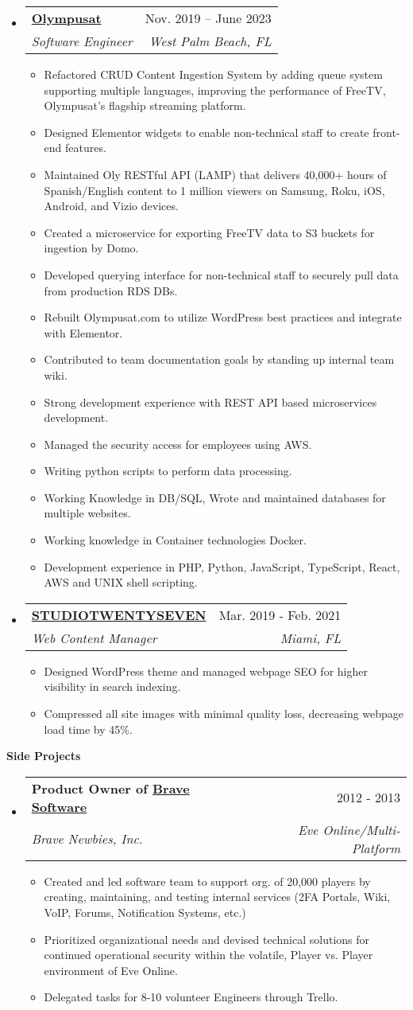 \documentclass[letterpaper,10pt]{article}[leftmargin=*]
\makeatletter
\def \entryspacing {-0pt}
\renewcommand{\section}[2]{\vspace{5pt}
  \colorbox{secondary}{\color{white}\raggedbottom\normalsize\textbf{{#1}{\hspace{7pt}#2}}}
}
\newcommand{\resumeEntryStart}{\begin{itemize}[leftmargin=2.5mm]}
\newcommand{\resumeEntryEnd}{\end{itemize}\vspace{\entryspacing}}
\newcommand{\resumeItemListStart}{\begin{itemize}[leftmargin=4.5mm]}
\newcommand{\resumeItemListEnd}{\end{itemize}}
\newcommand{\resumeItem}[1]{
  \item\small{
    {#1 \vspace{-2pt}}
  }
}
\newcommand{\resumeEntryTSDL}[4]{
  \vspace{-1pt}\item[]
    \begin{tabularx}{0.97\textwidth}{X@{\hspace{60pt}}r}
      \textbf{\color{primary}#1} & {\firabook\color{accent}\small#2} \\
      \textit{\color{accent}\small#3} & \textit{\color{accent}\small#4} \\
    \end{tabularx}\vspace{-6pt}
}
\makeatother
\begin{document}
  \resumeEntryStart
    \resumeEntryTSDL
      {\href{https://www.linkedin.com/company/olympusat/}{Olympusat}}{Nov. 2019 -- June 2023}
      {Software Engineer}{West Palm Beach, FL}
    \resumeItemListStart
      \resumeItem{Refactored CRUD Content Ingestion System by adding queue system supporting multiple languages, improving the performance of FreeTV, Olympusat’s flagship streaming platform.}
      \resumeItem{Designed Elementor widgets to enable non-technical staff to create front-end features.}
      \resumeItem{Maintained Oly RESTful API (LAMP) that delivers 40,000+ hours of Spanish/English content to 1 million viewers on Samsung, Roku, iOS, Android, and Vizio devices.}
      \resumeItem{Created a microservice for exporting FreeTV data to S3 buckets for ingestion by Domo.}
      \resumeItem{Developed querying interface for non-technical staff to securely pull data from production RDS DBs.}
      \resumeItem{Rebuilt Olympusat.com to utilize WordPress best practices and integrate with Elementor.}
      \resumeItem{Contributed to team documentation goals by standing up internal team wiki.}
      \resumeItem{Strong development experience with REST API based microservices development.}
      \resumeItem{Managed the security access for employees using AWS.}
      \resumeItem{Writing python scripts to perform data processing.}
      \resumeItem{Working Knowledge in DB/SQL, Wrote and maintained databases for multiple websites.}
      \resumeItem{Working knowledge in Container technologies Docker.}
      \resumeItem{Development experience in PHP, Python, JavaScript, TypeScript, React, AWS and UNIX shell scripting.}
    \resumeItemListEnd
  \resumeEntryEnd

  \resumeEntryStart
    \resumeEntryTSDL
      {\href{https://studiotwentyseven.com/}{STUDIOTWENTYSEVEN}}{Mar. 2019 - Feb. 2021}
      {Web Content Manager}{Miami, FL}
    \resumeItemListStart
      \resumeItem{Designed WordPress theme and managed webpage SEO for higher visibility in search indexing.}
      \resumeItem{Compressed all site images with minimal quality loss, decreasing webpage load time by 45\%.}
    \resumeItemListEnd
  \resumeEntryEnd

\section{\faFlask}{Side Projects}

  \resumeEntryStart
    \resumeEntryTSDL
      {Product Owner of \href{https://github.com/bravecollective}{Brave Software} }{2012 - 2013}
      {Brave Newbies, Inc.}{Eve Online/Multi-Platform}
    \resumeItemListStart
      \resumeItem {Created and led software team to support org. of 20,000 players by creating, maintaining, and testing internal services (2FA Portals, Wiki, VoIP, Forums, Notification Systems, etc.)}
      \resumeItem {Prioritized organizational needs and devised technical solutions for continued operational security within the volatile, Player vs. Player environment of Eve Online.}
      \resumeItem {Delegated tasks for 8-10 volunteer Engineers through Trello.}
    \resumeItemListEnd
  \resumeEntryEnd
\end{document}
